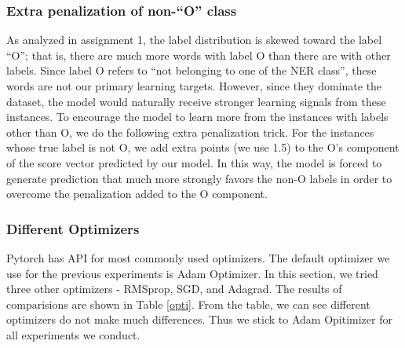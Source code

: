 \documentclass[11pt,a4paper]{article}
\begin{document}






\subsubsection{Extra penalization of non-``O'' class}

	As analyzed in assignment 1, the label distribution is skewed toward the label ``O''; that is, there are much more words with label O than there are with other labels. Since label O refers to ``not belonging to one of the NER class'', these words are not our primary learning targets. However, since they dominate the dataset, the model would naturally receive stronger learning signals from these instances. To encourage the model to learn more from the instances with labels other than O, we do the following extra penalization trick. For the instances whose true label is not O, we add extra points (we use 1.5) to the O's component of the score vector predicted by our model. In this way, the model is forced to generate prediction that much more strongly favors the non-O labels in order to overcome the penalization added to the O component.


\subsubsection{Different Optimizers}

Pytorch has API for most commonly used optimizers. The default optimizer we use for the previous experiments is Adam Optimizer. In this section, we tried three other optimizers - RMSprop, SGD, and Adagrad. The results of comparisions are shown in Table \ref{opti}. From the table, we can see different optimizers do not make much differences. Thus we stick to Adam Opitimizer for all experiments we conduct. 
\end{document}
